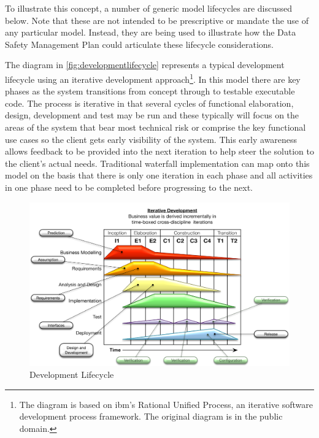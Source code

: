 To illustrate this concept, a number of generic model lifecycles are discussed below. Note that these are not intended to be prescriptive or mandate the use of any particular model. Instead, they are being used to illustrate how the Data Safety Management Plan could articulate these lifecycle considerations.

 The diagram in \autoref{fig:developmentlifecycle} represents a typical development lifecycle using an iterative development approach\footnote{The diagram is based on \gls{ibm}'s Rational Unified Process, an iterative software development process framework. The original diagram is in the public domain.}. In this model there are key phases as the system transitions from concept through to testable executable code. The process is iterative in that several cycles of functional elaboration, design, development and test may be run and these typically will focus on the areas of the system that bear most technical risk or comprise the key functional use cases so the client gets early visibility of the system. This early awareness allows feedback to be provided into the next iteration to help steer the solution to the client's actual needs. Traditional waterfall implementation can map onto this model on the basis that there is only one iteration in each phase and all activities in one phase need to be completed before progressing to the next.

\begin{figure}[htbp]
  \centering
  \includegraphics[width=\textwidth]{images/developmentlifecycleflat}
  \caption{Development Lifecycle}
  \label{fig:developmentlifecycle}
\end{figure}

